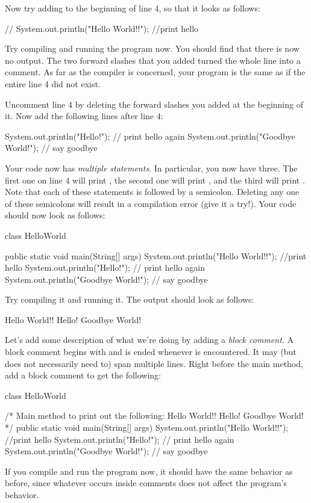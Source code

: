 Now try adding \ic{//} to the beginning of line 4, so that it looks as follows:
\begin{code}
//        System.out.println("Hello World!!"); //print hello
\end{code}
Try compiling and running the program now. You should find that there is now no output. The two forward slashes that you added turned the whole line into a comment. As far as the compiler is concerned, your program is the same
as if the entire line 4 did not exist.

Uncomment line 4 by deleting the forward slashes you added at the beginning of it.
Now add the following lines after line 4:
\begin{code}
System.out.println("Hello!"); // print hello again
System.out.println("Goodbye World!"); // say goodbye
\end{code}
Your code now has \emph{multiple statements}. In particular, you now have three. The first one on line 4 will print
, the second one will print , and the third will print .
Note that each of these statements is followed by a semicolon.
Deleting any one of these semicolons will result in a compilation error (give it a try!).
Your code should now look as follows:
\begin{code}
class HelloWorld {
    
    public static void main(String[] args) {
        System.out.println("Hello World!!"); //print hello
        System.out.println("Hello!"); // print hello again
        System.out.println("Goodbye World!"); // say goodbye
    }
    
}
\end{code}
Try compiling it and running it. The output should look as follows:
\begin{code}
Hello World!!
Hello!
Goodbye World!
\end{code}

Let's add some description of what we're doing by adding a \emph{block comment}.
A block comment begins with \ic{/*} and is ended whenever \ic{*/} is encountered.
It may (but does not necessarily need to) span multiple lines.
Right before the main method, add a block comment to get the following:
\begin{code}
class HelloWorld {

    /* Main method to print out the following:
         Hello World!!
         Hello!
         Goodbye World!
    */
    public static void main(String[] args) {
        System.out.println("Hello World!!"); //print hello
        System.out.println("Hello!"); // print hello again
        System.out.println("Goodbye World!"); // say goodbye
    }

}
\end{code}
If you compile and run the program now, it should have the same behavior as before, since whatever occurs
inside comments does not affect the program's behavior.

